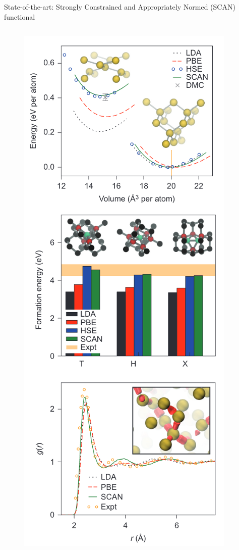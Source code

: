 \documentclass[aspectratio=169]{beamer}
\begin{document}
\begin{frame}{State-of-the-art: Strongly Constrained and Appropriately Normed (SCAN) functional}
\begin{columns}
\begin{figure}
    \centering
    \includegraphics[width=0.8\linewidth]{lectures/figures/6_scan_performance_2.png}
\end{figure}
\end{columns} 

\end{frame}
\end{document}
